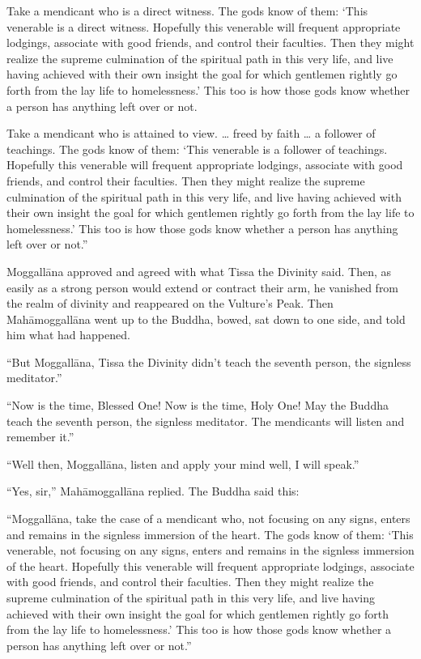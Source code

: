 \documentclass[12pt,openany]{book}%
\begin{document}
Take a mendicant who is a direct witness. The gods know of them: ‘This venerable is a direct witness. Hopefully this venerable will frequent appropriate lodgings, associate with good friends, and control their faculties. Then they might realize the supreme culmination of the spiritual path in this very life, and live having achieved with their own insight the goal for which gentlemen rightly go forth from the lay life to homelessness.’ This too is how those gods know whether a person has anything left over or not. 

Take a mendicant who is attained to view. … freed by faith … a follower of teachings. The gods know of them: ‘This venerable is a follower of teachings. Hopefully this venerable will frequent appropriate lodgings, associate with good friends, and control their faculties. Then they might realize the supreme culmination of the spiritual path in this very life, and live having achieved with their own insight the goal for which gentlemen rightly go forth from the lay life to homelessness.’ This too is how those gods know whether a person has anything left over or not.” 

\textsanskrit{Moggallāna} approved and agreed with what Tissa the Divinity said. Then, as easily as a strong person would extend or contract their arm, he vanished from the realm of divinity and reappeared on the Vulture’s Peak. Then \textsanskrit{Mahāmoggallāna} went up to the Buddha, bowed, sat down to one side, and told him what had happened. 

“But \textsanskrit{Moggallāna}, Tissa the Divinity didn’t teach the seventh person, the signless meditator.” 

“Now is the time, Blessed One! Now is the time, Holy One! May the Buddha teach the seventh person, the signless meditator. The mendicants will listen and remember it.” 

“Well then, \textsanskrit{Moggallāna}, listen and apply your mind well, I will speak.” 

“Yes, sir,” \textsanskrit{Mahāmoggallāna} replied. The Buddha said this: 

“\textsanskrit{Moggallāna}, take the case of a mendicant who, not focusing on any signs, enters and remains in the signless immersion of the heart. The gods know of them: ‘This venerable, not focusing on any signs, enters and remains in the signless immersion of the heart. Hopefully this venerable will frequent appropriate lodgings, associate with good friends, and control their faculties. Then they might realize the supreme culmination of the spiritual path in this very life, and live having achieved with their own insight the goal for which gentlemen rightly go forth from the lay life to homelessness.’ This too is how those gods know whether a person has anything left over or not.” 
\end{document}
